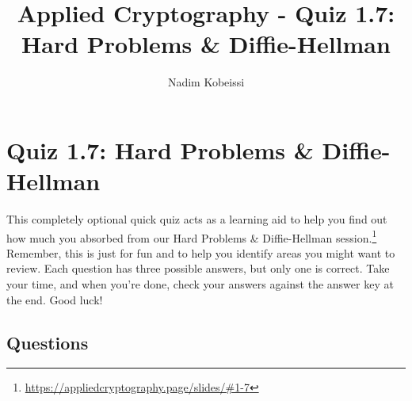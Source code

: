 \documentclass[10pt,a4paper,american]{exam}
\title{Applied Cryptography - Quiz 1.7: Hard Problems \& Diffie-Hellman}
\author{Nadim Kobeissi}
\begin{document}
\classhandoutheader
\section*{Quiz 1.7: Hard Problems \& Diffie-Hellman}

\begin{tcolorbox}[colframe=OliveGreen!30!white,colback=OliveGreen!5!white]
	This completely optional quick quiz acts as a learning aid to help you find out how much you absorbed from our Hard Problems \& Diffie-Hellman session.\footnote{\url{https://appliedcryptography.page/slides/\#1-7}} Remember, this is just for fun and to help you identify areas you might want to review. Each question has three possible answers, but only one is correct. Take your time, and when you're done, check your answers against the answer key at the end. Good luck!
\end{tcolorbox}

\subsection*{Questions}
\end{document}

